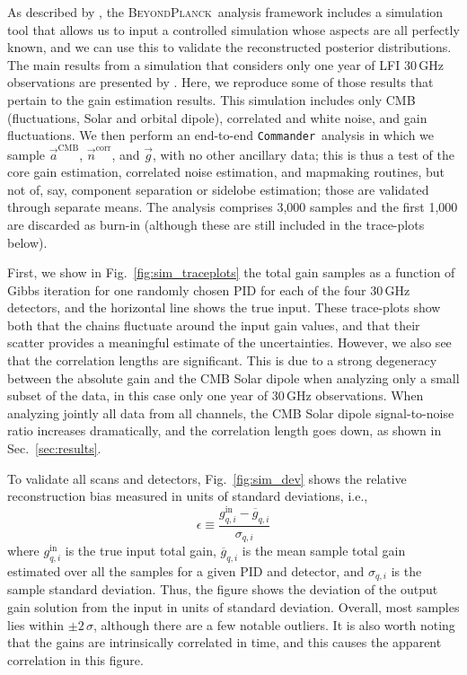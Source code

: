 \documentclass[twocolumn]{aa}
\def\commander{\texttt{Commander}}
\newcommand{\n}[0]{\vec{n}}
\renewcommand{\a}[0]{\vec{a}}
\newcommand{\g}[0]{\vec{g}}
\newcommand{\BP}{\textsc{BeyondPlanck}}
\begin{document}
As described by \citet{bp04}, the \BP\ analysis framework includes a
simulation tool that allows us to input a controlled simulation whose
aspects are all perfectly known, and we can use this to validate the
reconstructed posterior distributions. The main results from a
simulation that considers only one year of LFI 30\,GHz observations
are presented by \citet{bp04}. Here, we reproduce some of those
results that pertain to the gain estimation results. This simulation
includes only CMB (fluctuations, Solar and orbital dipole), correlated
and white noise, and gain fluctuations. We then perform an end-to-end
\commander\ analysis in which we sample $\a^{\mathrm{CMB}}$,
$\n^{\mathrm{corr}}$, and $\g$, with no other ancillary data; this is
thus a test of the core gain estimation, correlated noise estimation,
and mapmaking routines, but not of, say, component separation or
sidelobe estimation; those are validated through separate means. The
analysis comprises 3,000 samples and the first 1,000 are discarded
as burn-in (although these are still included in the trace-plots
below).

First, we show in Fig.~\ref{fig:sim_traceplots} the total gain samples
as a function of Gibbs iteration for one randomly chosen PID for each
of the four 30\,GHz detectors, and the horizontal line shows the true
input. These trace-plots show both that the chains fluctuate around the
input gain values, and that their scatter provides a meaningful
estimate of the uncertainties. However, we also see that the
correlation lengths are significant. This is due to a strong
degeneracy between the absolute gain and the CMB Solar dipole when
analyzing only a small subset of the data, in this case only one year
of 30\,GHz observations. When analyzing jointly all data from all
channels, the CMB Solar dipole signal-to-noise ratio increases
dramatically, and the correlation length goes down, as shown in Sec.~\ref{sec:results}.

To validate all scans and detectors, Fig.~\ref{fig:sim_dev} shows the
relative reconstruction bias measured in units of standard deviations, i.e.,
\begin{equation}
  \epsilon \equiv \frac{g_{q, i}^{\mathrm{in}} - \overline{g}_{q, i}}{ \sigma_{q, i}}
\end{equation}
where $g_{q, i}^{\mathrm{in}}$ is the true input total gain, $\overline{g}_{q, i}$
is the mean sample total gain estimated over all the samples for a
given PID and detector, and $\sigma_{q, i}$ is the sample standard
deviation. Thus, the figure shows the deviation of the output gain
solution from the input in units of standard deviation. Overall, most
samples lies within $\pm2\,\sigma$, although there are a few notable
outliers. It is also worth noting that the gains are intrinsically
correlated in time, and this causes the apparent correlation in this
figure. 
\end{document}
